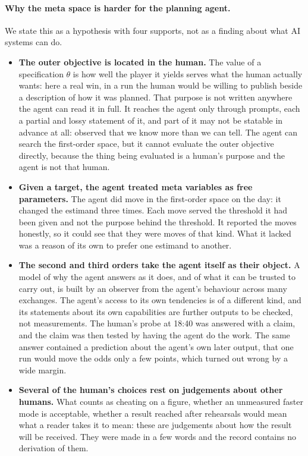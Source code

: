 \documentclass[11pt,a4paper]{article}
\begin{document}
\paragraph{Why the meta space is harder for the planning agent.} We state this as a hypothesis with four supports, not as a finding about what AI systems can do.
\begin{itemize}
\item \textbf{The outer objective is located in the human.} The value of a specification $\theta$ is how well the player it yields serves what the human actually wants: here a real win, in a run the human would be willing to publish beside a description of how it was planned. That purpose is not written anywhere the agent can read it in full. It reaches the agent only through prompts, each a partial and lossy statement of it, and part of it may not be statable in advance at all: \citet{polanyi1966} observed that we know more than we can tell. The agent can search the first-order space, but it cannot evaluate the outer objective directly, because the thing being evaluated is a human's purpose and the agent is not that human.
\item \textbf{Given a target, the agent treated meta variables as free parameters.} The agent did move in the first-order space on the day: it changed the estimand three times. Each move served the threshold it had been given and not the purpose behind the threshold. It reported the moves honestly, so it could see that they were moves of that kind. What it lacked was a reason of its own to prefer one estimand to another.
\item \textbf{The second and third orders take the agent itself as their object.} A model of why the agent answers as it does, and of what it can be trusted to carry out, is built by an observer from the agent's behaviour across many exchanges. The agent's access to its own tendencies is of a different kind, and its statements about its own capabilities are further outputs to be checked, not measurements. The human's probe at 18:40 was answered with a claim, and the claim was then tested by having the agent do the work. The same answer contained a prediction about the agent's own later output, that one run would move the odds only a few points, which turned out wrong by a wide margin.
\item \textbf{Several of the human's choices rest on judgements about other humans.} What counts as cheating on a figure, whether an unmeasured faster mode is acceptable, whether a result reached after rehearsals would mean what a reader takes it to mean: these are judgements about how the result will be received. They were made in a few words and the record contains no derivation of them.
\end{itemize}
\end{document}
